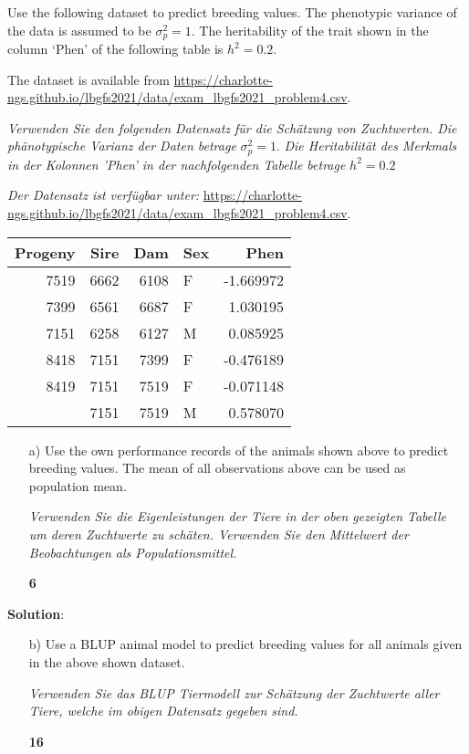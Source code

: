 \documentclass[
]{article}
\newcommand{\points}[1]
{\begin{flushright}\textbf{#1}\end{flushright}}
\newcommand{\solstart}
{\vspace{3ex}\textbf{Solution}:}
\begin{document}
Use the following dataset to predict breeding values. The phenotypic
variance of the data is assumed to be \(\sigma_p^2 = 1\). The
heritability of the trait shown in the column `Phen' of the following
table is \(h^2 = 0.2\).

The dataset is available from
\url{https://charlotte-ngs.github.io/lbgfs2021/data/exam_lbgfs2021_problem4.csv}.

\textit{Verwenden Sie den folgenden Datensatz für die Schätzung von Zuchtwerten. Die phänotypische Varianz der Daten betrage}
\(\sigma_p^2 = 1\).
\textit{Die Heritabilität des Merkmals in der Kolonnen 'Phen' in der nachfolgenden Tabelle betrage}
\(h^2 = 0.2\)

\textit{Der Datensatz ist verfügbar unter: }
\url{https://charlotte-ngs.github.io/lbgfs2021/data/exam_lbgfs2021_problem4.csv}.

\vspace{3ex}

\begin{tabular}{rrrlr}
\toprule
Progeny & Sire & Dam & Sex & Phen\\
\midrule
7519 & 6662 & 6108 & F & -1.669972\\
7399 & 6561 & 6687 & F & 1.030195\\
7151 & 6258 & 6127 & M & 0.085925\\
8418 & 7151 & 7399 & F & -0.476189\\
8419 & 7151 & 7519 & F & -0.071148\\
\addlinespace
8420 & 7151 & 7519 & M & 0.578070\\
\bottomrule
\end{tabular}

\vspace{3ex}
\begin{enumerate}
\item[a)] Use the own performance records of the animals shown above to predict breeding values. The mean of all observations above can be used as population mean. 

\textit{Verwenden Sie die Eigenleistungen der Tiere in der oben gezeigten Tabelle um deren Zuchtwerte zu schäten. Verwenden Sie den Mittelwert der Beobachtungen als Populationsmittel.}
\points{6}
\end{enumerate}

\solstart

\clearpage
\pagebreak

\begin{enumerate}
\item[b)] Use a BLUP animal model to predict breeding values for all animals given in the above shown dataset. 

\textit{Verwenden Sie das BLUP Tiermodell zur Schätzung der Zuchtwerte aller Tiere, welche im obigen Datensatz gegeben sind.}
\points{16}
\end{enumerate}
\end{document}

